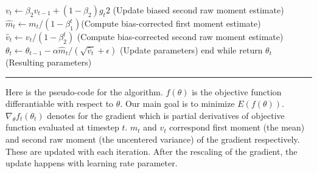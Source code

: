 \documentclass[10pt]{article}
\begin{document}
$v_t \leftarrow \beta_2  v_{t-1} + (1 - \beta_2)  g_t2$ (Update biased second raw moment estimate)  \newline
$\hat m_t \leftarrow m_t /(1-\beta_{1}^t)$(Compute bias-corrected first moment estimate) \newline
$ \hat v_t  \leftarrow v_t /(1 - \beta_2^t )$ (Compute bias-corrected second raw moment estimate) \newline
$ \theta_t \leftarrow \theta_{t-1} - \alpha   \hat m_t /(\sqrt{\hat v_t} + \epsilon)$ (Update parameters) \newline
end while \newline
return $\theta_t$ (Resulting parameters) \newline
\noindent\rule{12.5cm}{0.4pt}
Here is the pseudo-code for the algorithm. $f(\theta)$ is the objective function differantiable with respect to $\theta$. Our main goal is to minimize $E(f(\theta))$. $\nabla_{\theta}f_t(\theta_{t})$ denotes for the gradient which is partial derivatives of objective function evaluated at timestep $t$. $m_t$ and $v_t$ correspond first moment (the mean) and second raw moment (the uncentered variance) of the gradient respectively. These are updated with each iteration. After the rescaling of the gradient, the update happens with learning rate parameter.
\end{document}
